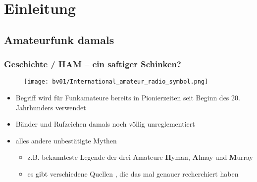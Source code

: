 

\subtitle{Betriebstechnik/Vorschriften 01: \\
  Welche Rechte/Pflichten hat ein Funkamateur? \\[2em]}
\date{Stand 10.10.2016}


\section{Einleitung}

\subsection{Amateurfunk damals}

\begin{frame}
  \frametitle{Geschichte / HAM -- ein saftiger Schinken?}

  \begin{center}
    \begin{figure}
      \texttt{[image: bv01/International\_amateur\_radio\_symbol.png]}
    \end{figure}
  \end{center}

  \begin{itemize}
    \item Begriff wird für Funkamateure bereits in Pionierzeiten seit Beginn
      des 20.\,Jahrhunders verwendet
    \item Bänder und Rufzeichen damals noch völlig unreglementiert
    \item alles andere unbestätigte Mythen
      \begin{itemize}
        \item z.B. bekannteste Legende der drei Amateure \textbf{H}yman,
          \textbf{A}lmay und \textbf{M}urray
        \item es gibt verschiedene Quellen \hyperlink{refs}{\cite{ham}},
          die das mal genauer recherchiert haben
      \end{itemize}
  \end{itemize}

\end{frame}

